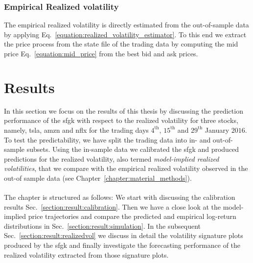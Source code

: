 \documentclass[11pt, a4paper]{thesis}  %
\begin{document}

\subsection{Empirical Realized volatility}


\label{section:methods:empirical_realized_volatility}

The empirical realized volatility is directly estimated from the out-of-sample data by applying Eq.~\ref{equation:realized_volatility_estimator}. To this end we extract the price process from the state file of the trading data by computing the mid price Eq.~\ref{equation:mid_price} from the best bid and ask prices.

%
%

\chapter{Results}
\label{chapter:results}


In this section we focus on the results of this thesis by discussing the prediction performance of the \ac{sfgk} with respect to the realized volatility for three stocks, namely, \ac{tsla}, \ac{amzn} and \ac{nflx} for the trading days $4^\textrm{th}$, $15^\textrm{th}$ and $29^\textrm{th}$ January $2016$. To test the predictability, we have split the trading data into in- and out-of-sample subsets. Using the in-sample data we calibrated the \ac{sfgk} and produced predictions for the realized volatility, also termed {\it model-implied realized volatilities}, that we compare with the empirical realized volatility observed in the out-of sample data (see Chapter~\ref{chapter:material_methods}).
\\
\\
\noindent The chapter is structured as follows: We start with discussing the calibration results Sec.~\ref{section:result:calibration}. Then we have a close look at the model-implied price trajectories and compare the predicted and empirical log-return distributions in  Sec.~\ref{section:result:simulation}. In the subsequent Sec.~\ref{section:result:realizedvol} we discuss in detail the volatility signature plots produced by the \ac{sfgk} and finally investigate the forecasting performance of the realized volatility extracted from those signature plots. 
\end{document}
